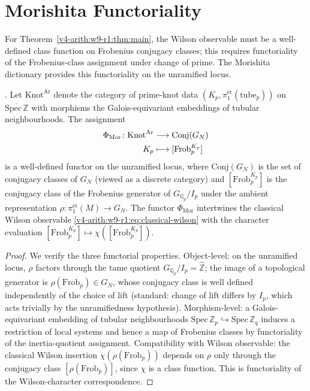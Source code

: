 \section{Morishita Functoriality}
\label{v4-arith:w9-r1:morishita}

For Theorem~\ref{v4-arith:w9-r1:thm:main}, the Wilson observable must
be a well-defined class function on Frobenius conjugacy classes; this
requires functoriality of the Frobenius-class assignment under change of
prime. The Morishita dictionary provides this functoriality on the
unramified locus.

\begin{theorem}
\label{v4-arith:w9-r1:thm:morishita-functor}
\ClaimStatusProvedHere. Let \(\mathrm{Knot}^{\mathrm{Ar}}\) denote the
category of prime-knot data
\((K_{p},\pi_{1}^{\mathrm{\acute et}}(\text{tube}_{p}))\) on
\(\overline{\mathrm{Spec}\,\mathbb Z}\) with morphisms the Galois-equivariant
embeddings of tubular neighbourhoods. The assignment
\begin{align}
\label{v4-arith:w9-r1:eq:morishita-functor}
\Phi_{\mathrm{Mor}}\colon \mathrm{Knot}^{\mathrm{Ar}}
&\longrightarrow \mathrm{Conj}(G_{N})\\
K_{p}&\longmapsto[\mathrm{Frob}_{p}^{K_{p}}]\notag
\end{align}
is a well-defined functor on the unramified locus, where
\(\mathrm{Conj}(G_{N})\) is the set of conjugacy classes of \(G_{N}\)
(viewed as a discrete category) and
\([\mathrm{Frob}_{p}^{K_{p}}]\) is the conjugacy class of the Frobenius
generator of \(G_{\mathbb Q_{p}}/I_{p}\) under the ambient
representation \(\rho\colon\pi_{1}^{\mathrm{\acute et}}(M)\to G_{N}\).
The functor \(\Phi_{\mathrm{Mor}}\) intertwines the classical Wilson
observable \eqref{v4-arith:w9-r1:eq:classical-wilson} with the character
evaluation
\([\mathrm{Frob}_{p}^{K_{p}}]\mapsto\chi([\mathrm{Frob}_{p}^{K_{p}}])\).
\end{theorem}

\begin{proof}
We verify the three functorial properties. Object-level: on the
unramified locus, \(\rho\) factors through the tame quotient
\(G_{\mathbb Q_{p}}/I_{p}=\widehat{\mathbb Z}\); the image of a
topological generator is
\(\rho(\mathrm{Frob}_{p})\in G_{N}\), whose conjugacy class is well
defined independently of the choice of lift (standard: change of
lift differs by \(I_{p}\), which acts trivially by the unramifiedness
hypothesis). Morphism-level: a Galois-equivariant embedding of
tubular neighbourhoods
\(\mathrm{Spec}\,\mathbb Z_{p}\hookrightarrow
\mathrm{Spec}\,\mathbb Z_{q}\) induces a restriction of local systems
and hence a map of Frobenius classes by functoriality of the
inertia-quotient assignment. Compatibility with Wilson observable:
the classical Wilson insertion
\(\chi(\rho(\mathrm{Frob}_{p}))\) depends on \(\rho\) only through the
conjugacy class \([\rho(\mathrm{Frob}_{p})]\), since \(\chi\) is a class
function. This is functoriality of the Wilson-character correspondence.
\end{proof}

